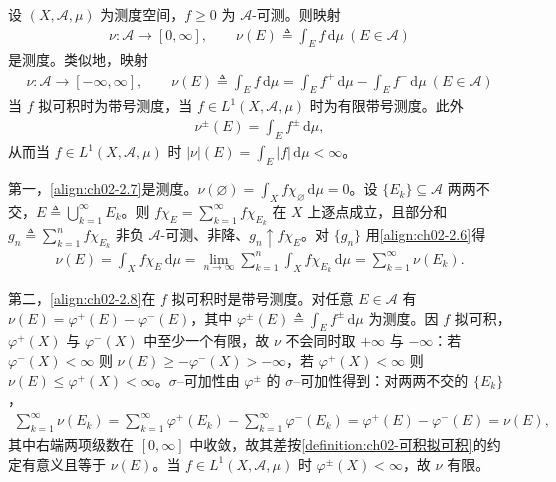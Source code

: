\documentclass[../../main.tex]{subfiles}%
\begin{document}
\begin{remark}\label{remark:ch02-测度密度}
设 $(X,\mathscr A,\mu)$ 为测度空间，$f\geqslant0$ 为 $\mathscr A$-可测。则映射
\begin{align}
\nu:\mathscr A\to[0,\infty],\qquad\nu(E)\triangleq\int_Ef\,\mathrm{d}\mu\ (E\in\mathscr A) \label{align:ch02-2.7}
\end{align}
是测度。类似地，映射
\begin{align}
\nu:\mathscr A\to[-\infty,\infty],\qquad\nu(E)\triangleq\int_Ef\,\mathrm{d}\mu=\int_Ef^+\,\mathrm{d}\mu-\int_Ef^-\,\mathrm{d}\mu\ (E\in\mathscr A) \label{align:ch02-2.8}
\end{align}
当 $f$ 拟可积时为带号测度，当 $f\in L^1(X,\mathscr A,\mu)$ 时为有限带号测度。此外
\begin{align}
\nu^\pm(E)=\int_Ef^\pm\,\mathrm{d}\mu, \label{align:ch02-2.9}
\end{align}
从而当 $f\in L^1(X,\mathscr A,\mu)$ 时 $|\nu|(E)=\int_E|f|\,\mathrm{d}\mu<\infty$。

第一，\eqref{align:ch02-2.7}是测度。$\nu(\varnothing)=\int_Xf\chi_\varnothing\,\mathrm{d}\mu=0$。设 $\{E_k\}\subseteq\mathscr A$ 两两不交，$E\triangleq\bigcup_{k=1}^\infty E_k$。则 $f\chi_E=\sum_{k=1}^\infty f\chi_{E_k}$ 在 $X$ 上逐点成立，且部分和 $g_n\triangleq\sum_{k=1}^nf\chi_{E_k}$ 非负 $\mathscr A$-可测、非降、$g_n\uparrow f\chi_E$。对 $\{g_n\}$ 用\eqref{align:ch02-2.6}得
\begin{align*}
\nu(E)=\int_Xf\chi_E\,\mathrm{d}\mu=\lim_{n\to\infty}\sum_{k=1}^n\int_Xf\chi_{E_k}\,\mathrm{d}\mu=\sum_{k=1}^\infty\nu(E_k).
\end{align*}

第二，\eqref{align:ch02-2.8}在 $f$ 拟可积时是带号测度。对任意 $E\in\mathscr A$ 有 $\nu(E)=\varphi^+(E)-\varphi^-(E)$，其中 $\varphi^\pm(E)\triangleq\int_Ef^\pm\,\mathrm{d}\mu$ 为测度。因 $f$ 拟可积，$\varphi^+(X)$ 与 $\varphi^-(X)$ 中至少一个有限，故 $\nu$ 不会同时取 $+\infty$ 与 $-\infty$：若 $\varphi^-(X)<\infty$ 则 $\nu(E)\geqslant-\varphi^-(X)>-\infty$，若 $\varphi^+(X)<\infty$ 则 $\nu(E)\leqslant\varphi^+(X)<\infty$。$\sigma$--可加性由 $\varphi^\pm$ 的 $\sigma$--可加性得到：对两两不交的 $\{E_k\}$，
\begin{align*}
\sum_{k=1}^\infty\nu(E_k)=\sum_{k=1}^\infty\varphi^+(E_k)-\sum_{k=1}^\infty\varphi^-(E_k)=\varphi^+(E)-\varphi^-(E)=\nu(E),
\end{align*}
其中右端两项级数在 $[0,\infty]$ 中收敛，故其差按\cref{definition:ch02-可积拟可积}的约定有意义且等于 $\nu(E)$。当 $f\in L^1(X,\mathscr A,\mu)$ 时 $\varphi^\pm(X)<\infty$，故 $\nu$ 有限。


\end{remark}
\end{document}
